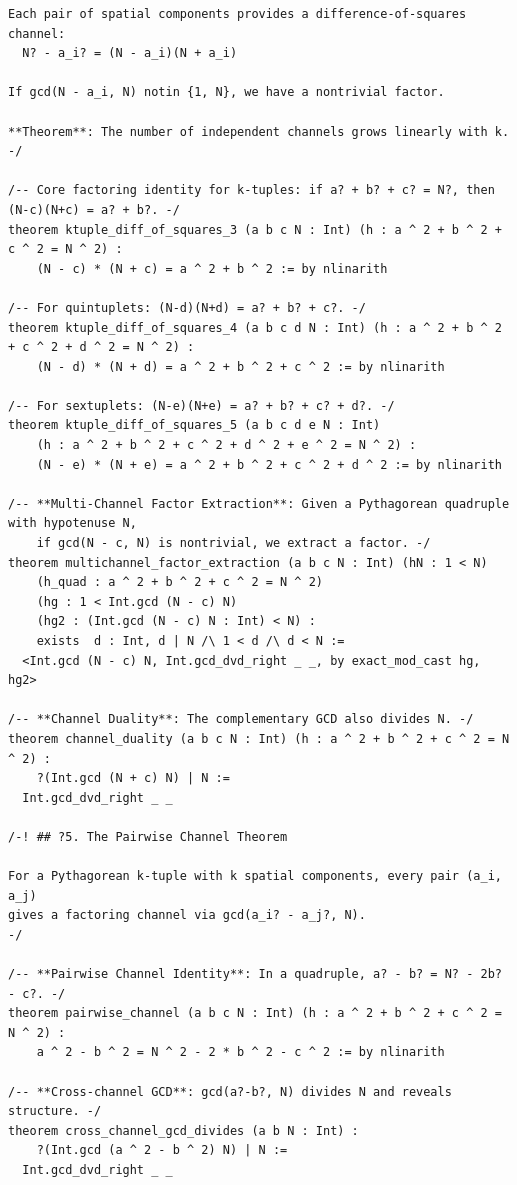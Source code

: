 \documentclass[11pt,twoside,openright]{book}
\theoremstyle{definition}
\theoremstyle{remark}
\begin{document}
\begin{lstlisting}[style=lean]
Each pair of spatial components provides a difference-of-squares channel:
  N? - a_i? = (N - a_i)(N + a_i)

If gcd(N - a_i, N) notin {1, N}, we have a nontrivial factor.

**Theorem**: The number of independent channels grows linearly with k.
-/

/-- Core factoring identity for k-tuples: if a? + b? + c? = N?, then (N-c)(N+c) = a? + b?. -/
theorem ktuple_diff_of_squares_3 (a b c N : Int) (h : a ^ 2 + b ^ 2 + c ^ 2 = N ^ 2) :
    (N - c) * (N + c) = a ^ 2 + b ^ 2 := by nlinarith

/-- For quintuplets: (N-d)(N+d) = a? + b? + c?. -/
theorem ktuple_diff_of_squares_4 (a b c d N : Int) (h : a ^ 2 + b ^ 2 + c ^ 2 + d ^ 2 = N ^ 2) :
    (N - d) * (N + d) = a ^ 2 + b ^ 2 + c ^ 2 := by nlinarith

/-- For sextuplets: (N-e)(N+e) = a? + b? + c? + d?. -/
theorem ktuple_diff_of_squares_5 (a b c d e N : Int)
    (h : a ^ 2 + b ^ 2 + c ^ 2 + d ^ 2 + e ^ 2 = N ^ 2) :
    (N - e) * (N + e) = a ^ 2 + b ^ 2 + c ^ 2 + d ^ 2 := by nlinarith

/-- **Multi-Channel Factor Extraction**: Given a Pythagorean quadruple with hypotenuse N,
    if gcd(N - c, N) is nontrivial, we extract a factor. -/
theorem multichannel_factor_extraction (a b c N : Int) (hN : 1 < N)
    (h_quad : a ^ 2 + b ^ 2 + c ^ 2 = N ^ 2)
    (hg : 1 < Int.gcd (N - c) N)
    (hg2 : (Int.gcd (N - c) N : Int) < N) :
    exists  d : Int, d | N /\ 1 < d /\ d < N :=
  <Int.gcd (N - c) N, Int.gcd_dvd_right _ _, by exact_mod_cast hg, hg2>

/-- **Channel Duality**: The complementary GCD also divides N. -/
theorem channel_duality (a b c N : Int) (h : a ^ 2 + b ^ 2 + c ^ 2 = N ^ 2) :
    ?(Int.gcd (N + c) N) | N :=
  Int.gcd_dvd_right _ _

/-! ## ?5. The Pairwise Channel Theorem

For a Pythagorean k-tuple with k spatial components, every pair (a_i, a_j)
gives a factoring channel via gcd(a_i? - a_j?, N).
-/

/-- **Pairwise Channel Identity**: In a quadruple, a? - b? = N? - 2b? - c?. -/
theorem pairwise_channel (a b c N : Int) (h : a ^ 2 + b ^ 2 + c ^ 2 = N ^ 2) :
    a ^ 2 - b ^ 2 = N ^ 2 - 2 * b ^ 2 - c ^ 2 := by nlinarith

/-- **Cross-channel GCD**: gcd(a?-b?, N) divides N and reveals structure. -/
theorem cross_channel_gcd_divides (a b N : Int) :
    ?(Int.gcd (a ^ 2 - b ^ 2) N) | N :=
  Int.gcd_dvd_right _ _


\end{lstlisting}
\end{document}
